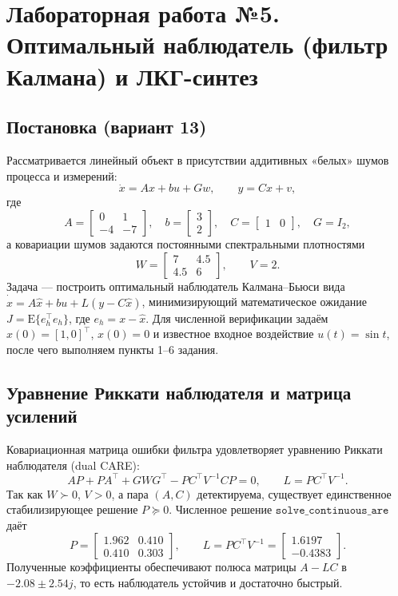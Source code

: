 \chapter{Лабораторная работа №5. Оптимальный наблюдатель (фильтр Калмана) и ЛКГ-синтез}

\section*{Постановка (вариант 13)}
Рассматривается линейный объект в присутствии аддитивных «белых» шумов процесса и измерений:
\[
\dot x = Ax + bu + Gw,\qquad y=Cx+v,
\]
где
\[
A=\begin{bmatrix}0&1\\-4&-7\end{bmatrix},\quad
b=\begin{bmatrix}3\\2\end{bmatrix},\quad
C=\begin{bmatrix}1&0\end{bmatrix},\quad
G=I_2,
\]
а ковариации шумов задаются постоянными спектральными плотностями
\[
W=\begin{bmatrix}7&4.5\\4.5&6\end{bmatrix},\qquad V=2.
\]
Задача — построить оптимальный наблюдатель Калмана–Бьюси вида
\(\dot{\hat x}=A\hat x+bu+L(y-C\hat x)\), минимизирующий математическое ожидание \(J=\mathrm{E}\{e_h^\top e_h\}\), где \(e_h=x-\hat x\). Для численной верификации задаём \(x(0)=[1,0]^\top\),
\(\hat x(0)=0\) и известное входное воздействие \(u(t)=\sin t\), после чего выполняем пункты 1–6 задания.

\section{Уравнение Риккати наблюдателя и матрица усилений}
Ковариационная матрица ошибки фильтра удовлетворяет уравнению Риккати наблюдателя (dual CARE):
\[
A P + P A^\top + G W G^\top - P C^\top V^{-1} C P = 0,\qquad L = P C^\top V^{-1}.
\]
Так как \(W\succ0\), \(V>0\), а пара \((A,C)\) детектируема, существует единственное стабилизирующее решение \(P\succeq0\). Численное решение \(\texttt{solve\_continuous\_are}\) даёт
\[
P=\begin{bmatrix}1.962 & 0.410\\ 0.410 & 0.303\end{bmatrix},\qquad
L=P C^\top V^{-1}=\begin{bmatrix}1.6197\\ -0.4383\end{bmatrix}.
\]
Полученные коэффициенты обеспечивают полюса матрицы \(A-LC\) в \(-2.08\pm2.54j\), то есть наблюдатель устойчив и достаточно быстрый.

